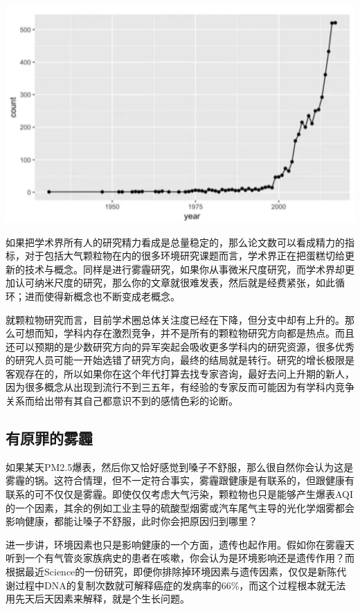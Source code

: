 \documentclass[]{book}
\begin{document}
\includegraphics[width=6.67in]{images/cw3}

如果把学术界所有人的研究精力看成是总量稳定的，那么论文数可以看成精力的指标，对于包括大气颗粒物在内的很多环境研究课题而言，学术界正在把蛋糕切给更新的技术与概念。同样是进行雾霾研究，如果你从事微米尺度研究，而学术界却更加认可纳米尺度的研究，那么你的文章就很难发表，然后就是经费紧张，如此循环；进而使得新概念也不断变成老概念。

就颗粒物研究而言，目前学术圈总体关注度已经在下降，但分支中却有上升的。那么可想而知，学科内存在激烈竞争，并不是所有的颗粒物研究方向都是热点。而且还可以预期的是少数研究方向的异军突起会吸收更多学科内的研究资源，很多优秀的研究人员可能一开始选错了研究方向，最终的结局就是转行。研究的增长极限是客观存在的，所以如果你在这个年代打算去找专家咨询，最好去问上升期的新人，因为很多概念从出现到流行不到三五年，有经验的专家反而可能因为有学科内竞争关系而给出带有其自己都意识不到的感情色彩的论断。

\subsection{有原罪的雾霾}

如果某天PM2.5爆表，然后你又恰好感觉到嗓子不舒服，那么很自然你会认为这是雾霾的锅。这符合情理，但不一定符合事实，雾霾跟健康是有联系的，但跟健康有联系的可不仅仅是雾霾。即使仅仅考虑大气污染，颗粒物也只是能够产生爆表AQI的一个因素，其余的例如工业主导的硫酸型烟雾或汽车尾气主导的光化学烟雾都会影响健康，都能让嗓子不舒服，此时你会把原因归到哪里？

进一步讲，环境因素也只是影响健康的一个方面，遗传也起作用。假如你在雾霾天听到一个有气管炎家族病史的患者在咳嗽，你会认为是环境影响还是遗传作用？而根据最近Science的一份研究，即便你排除掉环境因素与遗传因素，仅仅是新陈代谢过程中DNA的复制次数就可解释癌症的发病率的66\%，而这个过程根本就无法用先天后天因素来解释，就是个生长问题。
\end{document}
